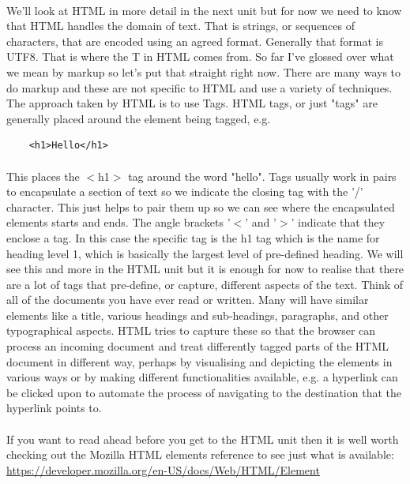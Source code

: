 \documentclass[12pt, a4paper, oneside]{book}
\begin{document}
\paragraph{} We'll look at HTML in more detail in the next unit but for now we need to know that HTML handles  the domain of text. That is strings, or sequences of characters, that are encoded using an agreed format. Generally that format is UTF8. That is where the T in HTML comes from. So far I've glossed over what we mean by markup so let's put that straight right now. There are many ways to do markup and these are not specific to HTML and use a variety of techniques. The approach taken by HTML is to use Tags. HTML tags, or just "tags" are generally placed around the element being tagged, e.g. 
\begin{lstlisting}
    <h1>Hello</h1> 
\end{lstlisting}

\paragraph{} This places the $<$h1$>$ tag around the word "hello". Tags usually work in pairs to encapsulate a section of text so we indicate the closing tag with the '/' character. This just helps to pair them up so we can see where the encapsulated elements starts and ends. The angle brackets '$<$' and '$>$' indicate that they enclose a tag. In this case the specific tag is the h1 tag which is the name for heading level 1, which is basically the largest level of pre-defined heading. We will see this and more in the HTML unit but it is enough for now to realise that there are a lot of tags that pre-define, or capture,  different aspects of the text. Think of all of the documents you have ever read or written. Many will have similar elements like a title, various headings and sub-headings, paragraphs, and other typographical aspects. HTML tries to capture these so that the browser can process an incoming document and treat differently tagged parts of the HTML document in different way, perhaps by visualising and depicting the elements in various ways or by making different functionalities available, e.g. a hyperlink can be clicked upon to automate the process of navigating to the destination that the hyperlink points to.
\paragraph{} If you want to read ahead before you get to the HTML unit then it is well worth checking out the Mozilla HTML elements reference to see just what is available:
	\url{https://developer.mozilla.org/en-US/docs/Web/HTML/Element}
\end{document}
